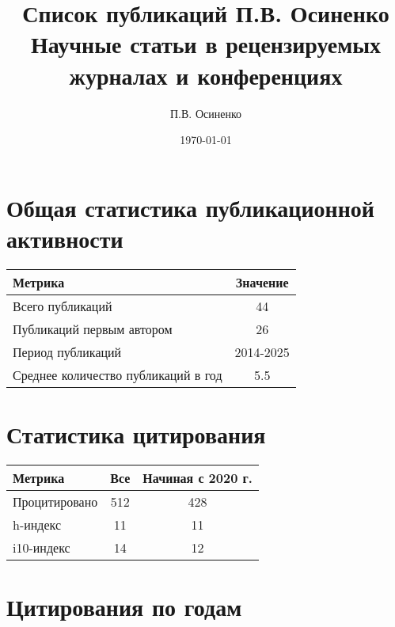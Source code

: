 \documentclass{article}
\begin{document}
\title{Список публикаций П.В. Осиненко\\
\large Научные статьи в рецензируемых журналах и конференциях}
\author{П.В. Осиненко}
\date{\today}
\maketitle

\section*{Общая статистика публикационной активности}

\begin{table}[h]
\centering
\begin{tabular}{|l|c|}
\hline
\textbf{Метрика} & \textbf{Значение} \\
\hline
Всего публикаций & 44 \\
\hline
Публикаций первым автором & 26 \\
\hline
Период публикаций & 2014-2025 \\
\hline
Среднее количество публикаций в год & 5.5 \\
\hline
\end{tabular}
\end{table}

\section*{Статистика цитирования}

\begin{table}[h]
\centering
\begin{tabular}{|l|c|c|}
\hline
\textbf{Метрика} & \textbf{Все} & \textbf{Начиная с 2020 г.} \\
\hline
Процитировано & 512 & 428 \\
\hline
h-индекс & 11 & 11 \\
\hline
i10-индекс & 14 & 12 \\
\hline
\end{tabular}
\end{table}

\section*{Цитирования по годам}
\end{document}
